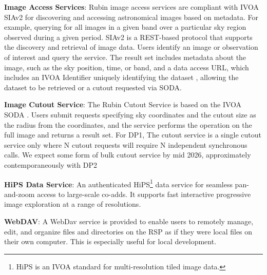 \vspace{0.1cm}
\textbf{Image Access Services}: Rubin image access services are compliant with \gls{IVOA} SIAv2 \citep[Simple Image Access Protocol, version 2;][]{2025arXiv250100544J,2015ivoa.spec.1223D}
for discovering and accessing astronomical images based on \gls{metadata}.
For example, querying for all images in a given band over a particular sky region observed during a given period.
SIAv2 is a \gls{REST}-based protocol that supports the discovery and retrieval of image data.
Users identify an image or observation of interest and query the service.
The result set includes \gls{metadata} about the image, such as the sky position, time, or band, and a data access URL, which includes an IVOA Identifier uniquely identifying the dataset \citep{DMTN-302}, allowing the dataset to be retrieved or a cutout requested via SODA.

\vspace{0.1cm}
\textbf{Image Cutout Service}: The Rubin Cutout Service \citep{SQR-063, SQR-093} is based on the  \gls{IVOA} SODA \citep[Server-side Operations for Data Access;][]{2017ivoa.spec.0517B}.
Users submit requests specifying sky coordinates and the cutout size as the radius from the coordinates, and the  service performs the operation on the full image and returns a result set.
For DP1, The  cutout service is a single cutout service only where N cutout requests will require N independent synchronous calls. 
We expect some form of bulk cutout service by mid 2026, approximately contemporaneously with \gls{DP2}

\vspace{0.1cm}
\textbf{HiPS Data Service}: An authenticated HiPS\footnote{HiPS is an IVOA standard for multi-resolution tiled image data.}
data service for seamless pan-and-zoom access to large-scale co-adds.
It supports fast interactive progressive image exploration at a range of resolutions.

\vspace{0.1cm}
\textbf{WebDAV}: A WebDav service is provided to enable users to remotely manage, edit, and organize files and directories on the RSP as if they were local files on their own computer. This is especially useful for local development.

